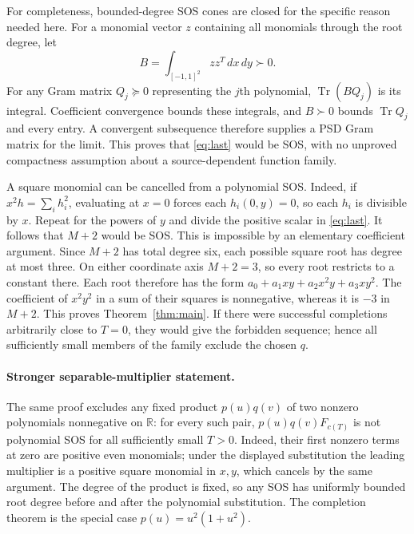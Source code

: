 \documentclass[11pt]{article}
\newcommand{\R}{\mathbb R}
\begin{document}
For completeness, bounded-degree SOS cones are closed for the specific
reason needed here. For a monomial vector $z$ containing all monomials through
the root degree, let
\[
B=\int_{[-1,1]^2}zz^T\,dx\,dy\succ0.
\]
For any Gram matrix $Q_j\succeq0$ representing the $j$th polynomial,
$\operatorname{Tr}(BQ_j)$ is its integral. Coefficient convergence bounds
these integrals, and $B\succ0$ bounds $\operatorname{Tr}Q_j$ and every entry.
A convergent subsequence therefore supplies a PSD Gram matrix for the limit.
This proves that \eqref{eq:last} would be SOS, with no unproved compactness
assumption about a source-dependent function family.

A square monomial can be cancelled from a polynomial SOS. Indeed, if
$x^2h=\sum_i h_i^2$, evaluating at $x=0$ forces each $h_i(0,y)=0$, so each
$h_i$ is divisible by $x$. Repeat for the powers of $y$ and divide the
positive scalar in \eqref{eq:last}. It follows that $M+2$ would be SOS.
This is impossible by an elementary coefficient argument. Since $M+2$ has
total degree six, each possible square root has degree at most three.
On either coordinate axis $M+2=3$, so every root restricts to a constant
there. Each root therefore has the form
$a_0+a_1xy+a_2x^2y+a_3xy^2$. The coefficient of $x^2y^2$ in a sum of their
squares is nonnegative, whereas it is $-3$ in $M+2$.
This proves Theorem~\ref{thm:main}. If there were successful completions
arbitrarily close to $T=0$, they would give the forbidden sequence; hence
all sufficiently small members of the family exclude the chosen $q$.

\paragraph{Stronger separable-multiplier statement.}
The same proof excludes any fixed product $p(u)q(v)$ of two nonzero
polynomials nonnegative on $\R$: for every such pair,
$p(u)q(v)F_{c(T)}$ is not polynomial SOS for all sufficiently small $T>0$.
Indeed, their first nonzero terms at zero are positive even monomials;
under the displayed substitution the leading multiplier is a positive
square monomial in $x,y$, which cancels by the same argument.
The degree of the product is fixed, so any SOS has uniformly bounded root
degree before and after the polynomial substitution. The completion theorem
is the special case $p(u)=u^2(1+u^2)$.
\end{document}
